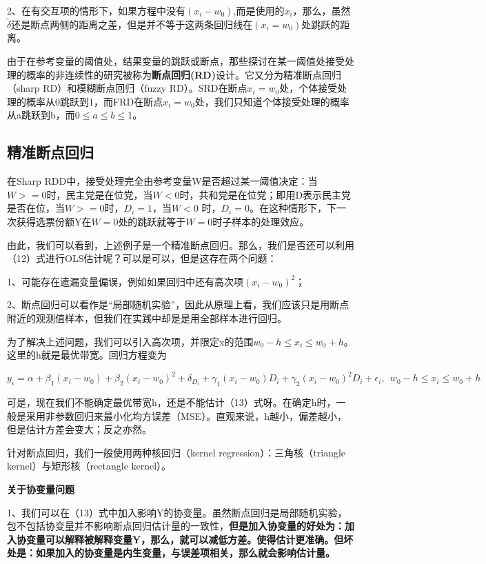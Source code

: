 \documentclass[cn,12pt,math=newtx,citestyle=gb7714-2015,bibstyle=gb7714-2015]{elegantbook}
\begin{document}
	2、在有交互项的情形下，如果方程中没有$(x_i-w_0)$,而是使用的$x_i$，那么，虽然$\tilde{\delta}$还是断点两侧的距离之差，但是并不等于这两条回归线在$(x_i=w_0)$处跳跃的距离。
	
	由于在参考变量的阈值处，结果变量的跳跃或断点，那些探讨在某一阈值处接受处理的概率的非连续性的研究被称为\textbf{断点回归(RD)}设计。它又分为精准断点回归（sharp RD）和模糊断点回归（fuzzy RD）。SRD在断点$x_i=w_0$处，个体接受处理的概率从0跳跃到1，而FRD在断点$x_i=w_0$处，我们只知道个体接受处理的概率从a跳跃到b，而$0\le{a}\le{b}\le{1}$。
	
	\subsection{精准断点回归}
	
	在Sharp RDD中，接受处理完全由参考变量W是否超过某一阈值决定：当$W>=0$时，民主党是在位党，当$W<0$时，共和党是在位党；即用D表示民主党是否在位，当$W>=0$时，$D_i=1$，当$W<0$ 时，$D_i=0$。在这种情形下，下一次获得选票份额Y在$W=0$处的跳跃就等于$W=0$时子样本的处理效应。
	
	由此，我们可以看到，上述例子是一个精准断点回归。那么，我们是否还可以利用（12）式进行OLS估计呢？可以是可以，但是这存在两个问题：
	
	1、可能存在遗漏变量偏误，例如如果回归中还有高次项$(x_i-w_0)^2$；
	
	2、断点回归可以看作是“局部随机实验”，因此从原理上看，我们应该只是用断点附近的观测值样本，但我们在实践中却是是用全部样本进行回归。
	
	为了解决上述问题，我们可以引入高次项，并限定x的范围$w_0-h\le{x_i}\le{w_0+h}$。这里的h就是最优带宽。回归方程变为
	
	\begin{equation}
		y_i=\alpha+\beta_1(x_i-w_0)+\beta_2(x_i-w_0)^2+\delta_{D_i}+\gamma_1(x_i-w_0)D_i+\gamma_2(x_i-w_0)^2D_i+\epsilon_i,~~w_0-h\le{x_i}\le{w_0+h}
	\end{equation}
	
	可是，现在我们不能确定最优带宽h，还是不能估计（13）式呀。在确定h时，一般是采用非参数回归来最小化均方误差（MSE）。直观来说，h越小，偏差越小，但是估计方差会变大；反之亦然。
	
	针对断点回归，我们一般使用两种核回归（kernel regression）：三角核（triangle kernel）与矩形核（rectangle kernel）。
	
	\textbf{关于协变量问题}
	
	1、我们可以在（13）式中加入影响Y的协变量。虽然断点回归是局部随机实验，包不包括协变量并不影响断点回归估计量的一致性，\textbf{但是加入协变量的好处为：加入协变量可以解释被解释变量Y，那么，就可以减低方差。使得估计更准确。但坏处是：如果加入的协变量是内生变量，与误差项相关，那么就会影响估计量。}
	
\end{document}
